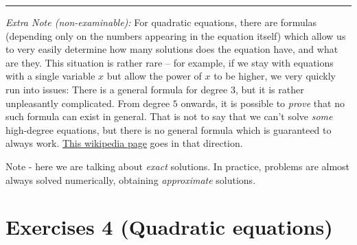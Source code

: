 \documentclass[
  12pt,
  oneside]{book}
\theoremstyle{definition}
\theoremstyle{definition}
\theoremstyle{definition}
\theoremstyle{definition}
\theoremstyle{remark}
\begin{document}
\begin{center}\rule{0.5\linewidth}{0.5pt}\end{center}

\emph{Extra Note (non-examinable):} For quadratic equations, there are formulas (depending only on the numbers appearing in the equation itself) which allow us to very easily determine how many solutions does the equation have, and what are they. This situation is rather rare -- for example, if we stay with equations with a single variable \(x\) but allow the power of \(x\) to be higher, we very quickly run into issues: There is a general formula for degree \(3\), but it is rather unpleasantly complicated. From degree \(5\) onwards, it is possible to \emph{prove} that no such formula can exist in general. That is not to say that we can't solve \emph{some} high-degree equations, but there is no general formula which is guaranteed to always work. \href{https://en.wikipedia.org/wiki/Galois_theory}{This wikipedia page} goes in that direction.

Note - here we are talking about \emph{exact} solutions. In practice, problems are almost always solved numerically, obtaining \emph{approximate} solutions.

\chapter*{Exercises 4 (Quadratic equations)}\label{exercises-4-quadratic-equations}
\end{document}
